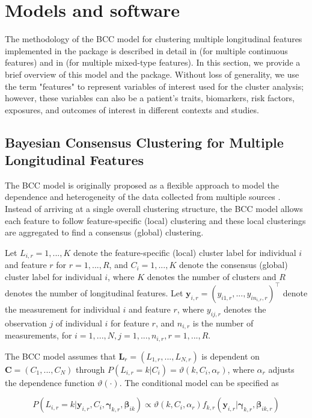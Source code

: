 \section{Models and software} \label{sec:models}

The methodology of the BCC model for clustering multiple longitudinal features implemented in the  package is described in detail in \citet{Lu2022} (for multiple continuous features) and in \citet{Tan2022a} (for multiple mixed-type features). In this section, we provide a brief overview of this model and the  package. Without loss of generality, we use the term "features" to represent variables of interest used for the cluster analysis; however, these variables can also be a patient's traits, biomarkers, risk factors, exposures, and outcomes of interest in different contexts and studies.

\subsection{Bayesian Consensus Clustering for Multiple Longitudinal Features}

The BCC model is originally proposed as a flexible approach to model the dependence and heterogeneity of the data collected from multiple sources \citep{Lock2013}. Instead of arriving at a single overall clustering structure, the BCC model allows each feature to follow feature-specific (local) clustering and these local clusterings are aggregated to find a consensus (global) clustering.

Let $L_{i,r} = 1,...,K$ denote the feature-specific (local) cluster label for individual $i$ and feature $r$ for $r=1,...,R$, and $C_i = 1,...,K$ denote the consensus (global) cluster label for individual $i$, where $K$ denotes the number of clusters and $R$ denotes the number of longitudinal features. Let $\boldsymbol{y}_{i,r} = (y_{i1,r}, ..., y_{in_{i,r},r})^\top$ denote the measurement for individual $i$ and feature $r$, where $y_{ij,r}$ denotes the observation $j$ of individual $i$ for feature $r$, and $n_{i,r}$ is the number of measurements, for $i=1,...,N, j=1,...,n_{i,r}, r=1,...,R$.

The BCC model assumes that $\boldsymbol{L}_{r} = (L_{1,r},...,L_{N,r})$ is dependent on $\boldsymbol{C} = (C_1,...,C_N)$ through $P(L_{i,r}=k|C_i) = \vartheta(k,C_i, \alpha_r)$, where $\alpha_r$ adjusts the dependence function $\vartheta(\cdot)$. The conditional model can be specified as 

\begin{equation}

P(L_{i,r}=k|\boldsymbol{y}_{i,r},C_i,\boldsymbol{\gamma}_{k,r}, \boldsymbol{\beta}_{ik}) \propto\vartheta(k,C_i,\alpha_r)f_{k,r}(\boldsymbol{y}_{i,r}|\boldsymbol{\gamma}_{k,r}, \boldsymbol{\beta}_{ik,r})

\end{equation}

